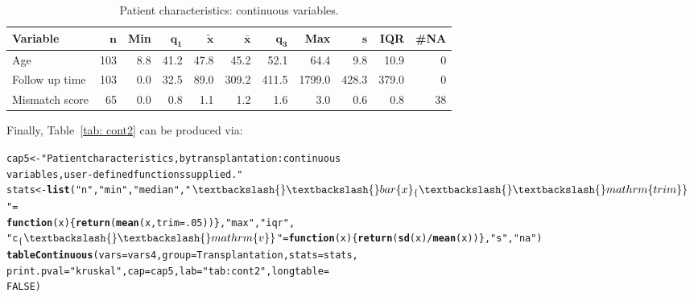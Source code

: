\documentclass[nojss]{jss}\usepackage[]{graphicx}\usepackage[]{color}
\makeatletter
\newcommand{\hlnum}[1]{\textcolor[rgb]{0.686,0.059,0.569}{#1}}%
\newcommand{\hlstr}[1]{\textcolor[rgb]{0.192,0.494,0.8}{#1}}%
\newcommand{\hlopt}[1]{\textcolor[rgb]{0,0,0}{#1}}%
\newcommand{\hlstd}[1]{\textcolor[rgb]{0.345,0.345,0.345}{#1}}%
\newcommand{\hlkwa}[1]{\textcolor[rgb]{0.161,0.373,0.58}{\textbf{#1}}}%
\newcommand{\hlkwb}[1]{\textcolor[rgb]{0.69,0.353,0.396}{#1}}%
\newcommand{\hlkwc}[1]{\textcolor[rgb]{0.333,0.667,0.333}{#1}}%
\newcommand{\hlkwd}[1]{\textcolor[rgb]{0.737,0.353,0.396}{\textbf{#1}}}%
\newenvironment{kframe}{%
 \def\at@end@of@kframe{}%
 \ifinner\ifhmode%
  \def\at@end@of@kframe{\end{minipage}}%
  \begin{minipage}{\columnwidth}%
 \fi\fi%
 \def\FrameCommand##1{\hskip\@totalleftmargin \hskip-\fboxsep
 \colorbox{shadecolor}{##1}\hskip-\fboxsep
     \hskip-\linewidth \hskip-\@totalleftmargin \hskip\columnwidth}%
 \MakeFramed {\advance\hsize-\width
   \@totalleftmargin\z@ \linewidth\hsize
   \@setminipage}}%
 {\par\unskip\endMakeFramed%
 \at@end@of@kframe}
\newenvironment{knitrout}{}{} %
\makeatother
\begin{document}
\pagebreak

\renewcommand{\baselinestretch}{1.15}
\begin{center}
\begin{table}[ht]
\centering
{\footnotesize
\begin{tabular}{lrrrrrrrrrr}
 \textbf{Variable} & $\mathbf{n}$ & \textbf{Min} & $\mathbf{q_1}$ & $\mathbf{\widetilde{x}}$ & $\mathbf{\bar{x}}$ & $\mathbf{q_3}$ & \textbf{Max} & $\mathbf{s}$ & \textbf{IQR} & \textbf{\#NA} \\ 
  \hline
Age & 103 & 8.8 & 41.2 & 47.8 &  45.2 &  52.1 &   64.4 &   9.8 &  10.9 &  0 \\ 
  Follow up time & 103 & 0.0 & 32.5 & 89.0 & 309.2 & 411.5 & 1799.0 & 428.3 & 379.0 &  0 \\ 
  Mismatch score &  65 & 0.0 &  0.8 &  1.1 &   1.2 &   1.6 &    3.0 &   0.6 &   0.8 & 38 \\ 
  \end{tabular}
}
\caption{Patient characteristics: continuous variables.} 
\label{tab: cont1}
\end{table}

\end{center}
\renewcommand{\baselinestretch}{1}

Finally, Table~\ref{tab: cont2} can be produced via:

\begin{knitrout}\footnotesize
{}\color{fgcolor}\begin{kframe}
\begin{alltt}
\hlstd{cap5} \hlkwb{<-} \hlstr{"Patient characteristics, by transplantation: continuous 
  variables, user-defined functions supplied."}
\hlstd{stats} \hlkwb{<-} \hlkwd{list}\hlstd{(}\hlstr{"n"}\hlstd{,} \hlstr{"min"}\hlstd{,} \hlstr{"median"}\hlstd{,} \hlstr{"$\textbackslash{}\textbackslash{}bar\{x\}_\{\textbackslash{}\textbackslash{}mathrm\{trim\}\}$"} \hlstd{=}
  \hlkwa{function}\hlstd{(}\hlkwc{x}\hlstd{)\{}\hlkwd{return}\hlstd{(}\hlkwd{mean}\hlstd{(x,} \hlkwc{trim} \hlstd{=} \hlnum{.05}\hlstd{))\},} \hlstr{"max"}\hlstd{,} \hlstr{"iqr"}\hlstd{,}
  \hlstr{"c$_\{\textbackslash{}\textbackslash{}mathrm\{v\}\}$"} \hlstd{=} \hlkwa{function}\hlstd{(}\hlkwc{x}\hlstd{)\{}\hlkwd{return}\hlstd{(}\hlkwd{sd}\hlstd{(x)} \hlopt{/} \hlkwd{mean}\hlstd{(x))\},} \hlstr{"s"}\hlstd{,} \hlstr{"na"}\hlstd{)}
\hlkwd{tableContinuous}\hlstd{(}\hlkwc{vars} \hlstd{= vars4,} \hlkwc{group} \hlstd{= Transplantation,} \hlkwc{stats} \hlstd{= stats,}
  \hlkwc{print.pval} \hlstd{=} \hlstr{"kruskal"}\hlstd{,} \hlkwc{cap} \hlstd{= cap5,} \hlkwc{lab} \hlstd{=} \hlstr{"tab: cont2"}\hlstd{,} \hlkwc{longtable} \hlstd{=}
  \hlnum{FALSE}\hlstd{)}
\end{alltt}
\end{kframe}
\end{knitrout}
\end{document}
